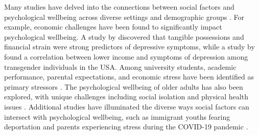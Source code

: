 Many studies have delved into the connections between social factors and psychological wellbeing across diverse settings and demographic groups \cite{brydsten2018health, lecerof2015does, han2015social, reibling2017depressed, li2022suffered, groot2022impact, de2017gender, frik2023model, oguamanam2023intersectional, murnane2018personal}. For example, economic challenges have been found to significantly impact psychological wellbeing. A study by \citet{guan2022financial} discovered that tangible possessions and financial strain were strong predictors of depressive symptoms, while a study by \citet{katz2017self} found a correlation between lower income and symptoms of depression among transgender individuals in the USA. Among university students, academic performance, parental expectations, and economic stress have been identified as primary stressors \cite{de2016relationship, bruffaerts2018mental, lattie2020designing}. The psychological wellbeing of older adults has also been explored, with unique challenges including social isolation and physical health issues \cite{carod2017social, mccrone2008paying}. Additional studies have illuminated the diverse ways social factors can intersect with psychological wellbeing, such as immigrant youths fearing deportation \cite{tachtler2021unaccompanied, tachtler2020supporting} and parents experiencing stress during the COVID-19 pandemic \cite{li2022suffered}.



